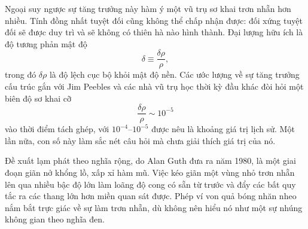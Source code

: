 Ngoại suy ngược sự tăng trưởng này hàm ý một vũ trụ sơ khai trơn nhẵn hơn nhiều. Tính đồng nhất tuyệt đối cũng không thể chấp nhận được: đối xứng tuyệt đối sẽ được duy trì và sẽ không có thiên hà nào hình thành. Đại lượng hữu ích là độ tương phản mật độ
\begin{equation}
\delta\equiv\frac{\delta\rho}{\rho},
\end{equation}
trong đó \(\delta\rho\) là độ lệch cục bộ khỏi mật độ nền. Các ước lượng về sự tăng trưởng cấu trúc gắn với Jim Peebles và các nhà vũ trụ học thời kỳ đầu khác đòi hỏi một biên độ sơ khai cỡ
\begin{equation}
\boxed{\frac{\delta\rho}{\rho}\sim10^{-5}}
\end{equation}
vào thời điểm tách ghép, với \(10^{-4}\)--\(10^{-5}\) được nêu là khoảng giá trị lịch sử. Một lần nữa, con số này làm sắc nét câu hỏi mà chưa giải thích giá trị của nó.

Đề xuất lạm phát theo nghĩa rộng, do Alan Guth đưa ra năm 1980, là một giai đoạn giãn nở khổng lồ, xấp xỉ hàm mũ. Việc kéo giãn một vùng nhỏ trơn nhẵn lên qua nhiều bậc độ lớn làm loãng độ cong có sẵn từ trước và đẩy các bất quy tắc ra các thang lớn hơn miền quan sát được. Phép ví von quả bóng nhăn nheo nắm bắt trực giác về sự làm trơn nhẵn, dù không nên hiểu nó như một sự nhúng không gian theo nghĩa đen.

\begin{classroomqa}
\end{classroomqa}

\begin{classroomqa}
\end{classroomqa}


